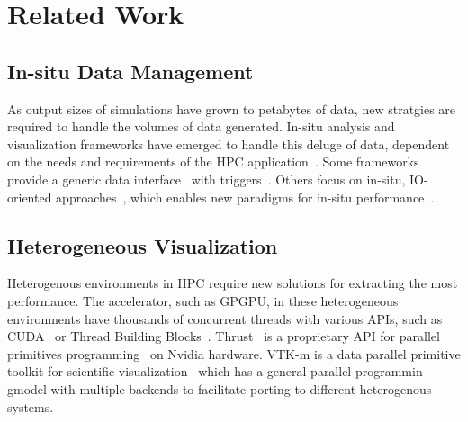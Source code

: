 \section{Related Work}
\subsection{In-situ Data Management}
As output sizes of simulations have grown to petabytes of data, new stratgies are required to handle the volumes of data generated. In-situ analysis and visualization frameworks have emerged to handle this deluge of data, dependent on the needs and requirements of the HPC application~\cite{Abbasi2010, Ayachit:2015:PCE:2828612.2828624,Childs:VisIt-HPV-Chapter:2012, 6846460}. Some frameworks provide a generic data interface~\cite{Ayachit:2016:SGS:3018859.3018867,Larsen:2017:ASI:3144769.3144778} with triggers~\cite{Larsen:2018:FSS:3281464.3281468}. Others focus on in-situ, IO-oriented approaches~\cite{doi:10.1002/cpe.3125}, which enables new paradigms for in-situ performance~\cite{Kress:ISC19}.

\subsection{Heterogeneous Visualization}
Heterogenous environments in HPC require new solutions for extracting the most performance. The accelerator, such as GPGPU, in these heterogeneous environments have thousands of concurrent threads with various APIs, such as CUDA~\cite{CUDA} or Thread Building Blocks~\cite{books:daglib:0018624}. Thrust~\cite{hoberock2009thrust} is a proprietary API for parallel primitives programming~\cite{Blelloch:1990:VMD:91254} on Nvidia hardware. VTK-m is a data parallel primitive toolkit for scientific visualization~\cite{vtkm} which has a general parallel programmin gmodel with multiple backends to facilitate porting to different heterogenous systems. 

